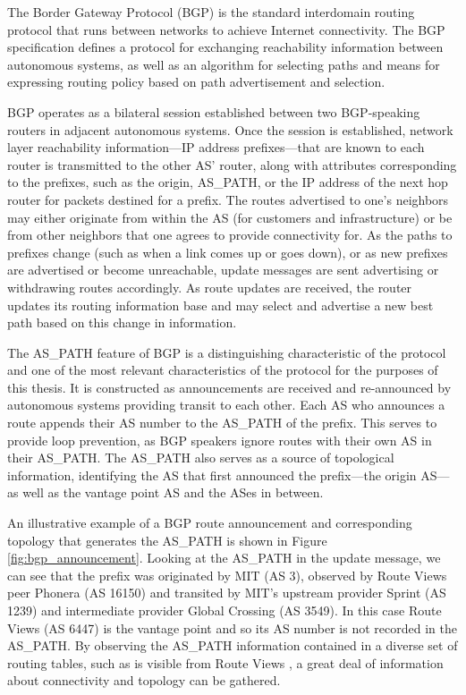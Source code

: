 The Border Gateway Protocol (BGP) is the standard interdomain routing protocol
that runs between networks to achieve Internet connectivity. The BGP
specification defines a protocol for exchanging reachability information
between autonomous systems, as well as an algorithm for selecting paths and
means for expressing routing policy based on path advertisement and selection.

BGP operates as a bilateral session established between two BGP-speaking
routers in adjacent autonomous systems. Once the session is established,
network layer reachability information---IP address prefixes---that are known
to each router is transmitted to the other AS' router, along with attributes
corresponding to the prefixes, such as the origin, AS\_PATH, or the IP address
of the next hop router for packets destined for a prefix. The routes
advertised to one's neighbors may either originate from within the AS (for
customers and infrastructure) or be from  other neighbors that one agrees to
provide connectivity for. As the paths to prefixes change (such as when a link
comes up or goes down), or as new prefixes are advertised or become
unreachable, update messages are sent advertising or withdrawing routes
accordingly. As route updates are received, the router updates its routing
information base and may select and advertise a new best path based on this
change in information.

The AS\_PATH feature of BGP is a distinguishing characteristic of the protocol
and one of the most relevant characteristics of the protocol for the purposes
of this thesis. It is constructed as announcements are received and
re-announced by autonomous systems providing transit to each other. Each AS who
announces a route appends their AS number to the AS\_PATH of the prefix. This
serves to provide loop prevention, as BGP speakers ignore routes with their own
AS in their AS\_PATH. The AS\_PATH also serves as a source of topological
information, identifying the AS that first announced the prefix---the origin
AS---as well as the vantage point AS and the ASes in between.

An illustrative example of a BGP route announcement and corresponding topology
that generates the AS\_PATH is shown in Figure \ref{fig:bgp_announcement}.
Looking at the AS\_PATH in the update message, we can see that the prefix was
originated by MIT (AS 3), observed by Route Views peer Phonera (AS 16150) and
transited by MIT's upstream provider Sprint (AS 1239) and intermediate provider
Global Crossing (AS 3549). In this case Route Views (AS 6447) is the vantage
point and so its AS number is not recorded in the AS\_PATH. By observing the
AS\_PATH information contained in a diverse set of routing tables, such as is
visible from Route Views \cite{Routeviews}, a great deal of information about
connectivity and topology can be gathered.

